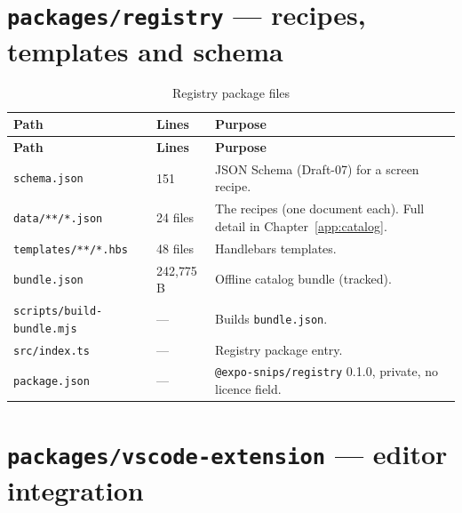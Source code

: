 \section{\texttt{packages/registry} --- recipes, templates and schema}

\begin{longtable}{@{}L{6cm}L{2.2cm}L{6.2cm}@{}}
\caption{Registry package files}\\
\toprule
\textbf{Path} & \textbf{Lines} & \textbf{Purpose} \\
\midrule
\endfirsthead
\toprule
\textbf{Path} & \textbf{Lines} & \textbf{Purpose} \\
\midrule
\endhead
\texttt{schema.json} & 151 & JSON Schema (Draft-07) for a screen recipe. \\
\texttt{data/**/*.json} & 24 files & The recipes (one document each). Full detail
in Chapter~\ref{app:catalog}. \\
\texttt{templates/**/*.hbs} & 48 files & Handlebars templates. \\
\texttt{bundle.json} & 242{,}775 B & Offline catalog bundle (tracked). \\
\texttt{scripts/build-bundle.mjs} & --- & Builds \texttt{bundle.json}. \\
\texttt{src/index.ts} & --- & Registry package entry. \\
\texttt{package.json} & --- & \texttt{@expo-snips/registry} 0.1.0, private, no
licence field. \\
\bottomrule
\end{longtable}

\section{\texttt{packages/vscode-extension} --- editor integration}

